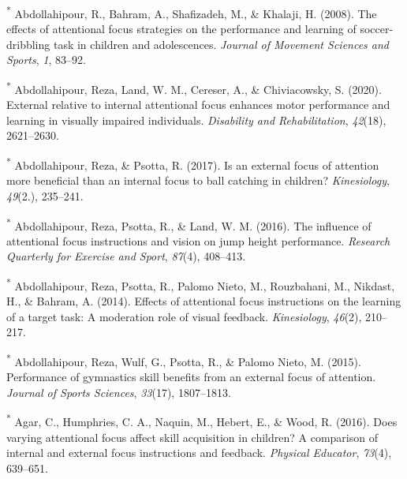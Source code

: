 \documentclass[
  man, donotrepeattitle,floatsintext]{apa7}
\newlength{\cslhangindent}
\newlength{\cslentryspacingunit} %
\newenvironment{CSLReferences}[2] %
 {%
  \setlength{\parindent}{0pt}
  \ifodd #1
  \let\oldpar\par
  \def\par{\hangindent=\cslhangindent\oldpar}
  \fi
  \setlength{\parskip}{#2\cslentryspacingunit}
 }%
 {}
\begin{document}
\hypertarget{refs}{}
\begin{CSLReferences}{1}{0}
\leavevmode{}%
\textsuperscript{*} Abdollahipour, R., Bahram, A., Shafizadeh, M., \& Khalaji, H. (2008). The effects of attentional focus strategies on the performance and learning of soccer-dribbling task in children and adolescences. \emph{Journal of Movement Sciences and Sports}, \emph{1}, 83--92.

\leavevmode{}%
\textsuperscript{*} Abdollahipour, Reza, Land, W. M., Cereser, A., \& Chiviacowsky, S. (2020). External relative to internal attentional focus enhances motor performance and learning in visually impaired individuals. \emph{Disability and Rehabilitation}, \emph{42}(18), 2621--2630.

\leavevmode{}%
\textsuperscript{*} Abdollahipour, Reza, \& Psotta, R. (2017). Is an external focus of attention more beneficial than an internal focus to ball catching in children? \emph{Kinesiology}, \emph{49}(2.), 235--241.

\leavevmode{}%
\textsuperscript{*} Abdollahipour, Reza, Psotta, R., \& Land, W. M. (2016). The influence of attentional focus instructions and vision on jump height performance. \emph{Research Quarterly for Exercise and Sport}, \emph{87}(4), 408--413.

\leavevmode{}%
\textsuperscript{*} Abdollahipour, Reza, Psotta, R., Palomo Nieto, M., Rouzbahani, M., Nikdast, H., \& Bahram, A. (2014). Effects of attentional focus instructions on the learning of a target task: A moderation role of visual feedback. \emph{Kinesiology}, \emph{46}(2), 210--217.

\leavevmode{}%
\textsuperscript{*} Abdollahipour, Reza, Wulf, G., Psotta, R., \& Palomo Nieto, M. (2015). Performance of gymnastics skill benefits from an external focus of attention. \emph{Journal of Sports Sciences}, \emph{33}(17), 1807--1813.

\leavevmode{}%
\textsuperscript{*} Agar, C., Humphries, C. A., Naquin, M., Hebert, E., \& Wood, R. (2016). Does varying attentional focus affect skill acquisition in children? A comparison of internal and external focus instructions and feedback. \emph{Physical Educator}, \emph{73}(4), 639--651.


\end{CSLReferences}
\end{document}
